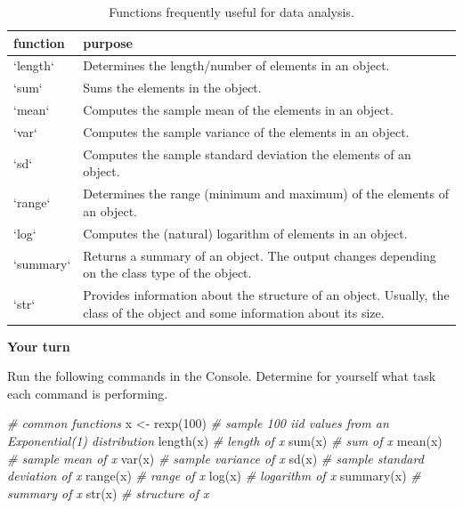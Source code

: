 \documentclass[
]{book}
\newenvironment{Shaded}{\begin{snugshade}}{\end{snugshade}}
\newcommand{\CommentTok}[1]{\textcolor[rgb]{0.56,0.35,0.01}{\textit{#1}}}
\newcommand{\DecValTok}[1]{\textcolor[rgb]{0.00,0.00,0.81}{#1}}
\newcommand{\FunctionTok}[1]{\textcolor[rgb]{0.00,0.00,0.00}{#1}}
\newcommand{\NormalTok}[1]{#1}
\newcommand{\OtherTok}[1]{\textcolor[rgb]{0.56,0.35,0.01}{#1}}
\theoremstyle{definition}
\theoremstyle{definition}
\theoremstyle{definition}
\theoremstyle{definition}
\theoremstyle{remark}
\begin{document}
\begin{table}

\caption{\label{tab:generalfunctions}Functions frequently useful for data analysis.}
\centering
\begin{tabular}[t]{l|l}
\hline
function & purpose\\
\hline
`length` & Determines the length/number of elements in an object.\\
\hline
`sum` & Sums the elements in the object.\\
\hline
`mean` & Computes the sample mean of the elements in an object.\\
\hline
`var` & Computes the sample variance of the elements in an object.\\
\hline
`sd` & Computes the sample standard deviation the elements of an object.\\
\hline
`range` & Determines the range (minimum and maximum) of the elements of an object.\\
\hline
`log` & Computes the (natural) logarithm of elements in an object.\\
\hline
`summary` & Returns a summary of an object. The output changes depending on the class type of the object.\\
\hline
`str` & Provides information about the structure of an object. Usually, the class of the object and some information about its size.\\
\hline
\end{tabular}
\end{table}

\begin{yourturn}

\textbf{Your turn}

Run the following commands in the Console. Determine for yourself what task each command is performing.

\begin{Shaded}
\begin{Highlighting}[]
\CommentTok{\# common functions}
\NormalTok{x }\OtherTok{\textless{}{-}} \FunctionTok{rexp}\NormalTok{(}\DecValTok{100}\NormalTok{) }\CommentTok{\# sample 100 iid values from an Exponential(1) distribution}
\FunctionTok{length}\NormalTok{(x) }\CommentTok{\# length of x}
\FunctionTok{sum}\NormalTok{(x) }\CommentTok{\# sum of x}
\FunctionTok{mean}\NormalTok{(x) }\CommentTok{\# sample mean of x}
\FunctionTok{var}\NormalTok{(x) }\CommentTok{\# sample variance of x}
\FunctionTok{sd}\NormalTok{(x) }\CommentTok{\# sample standard deviation of x}
\FunctionTok{range}\NormalTok{(x) }\CommentTok{\# range of x}
\FunctionTok{log}\NormalTok{(x) }\CommentTok{\# logarithm of x}
\FunctionTok{summary}\NormalTok{(x) }\CommentTok{\# summary of x}
\FunctionTok{str}\NormalTok{(x) }\CommentTok{\# structure of x}
\end{Highlighting}
\end{Shaded}

\end{yourturn}
\end{document}
